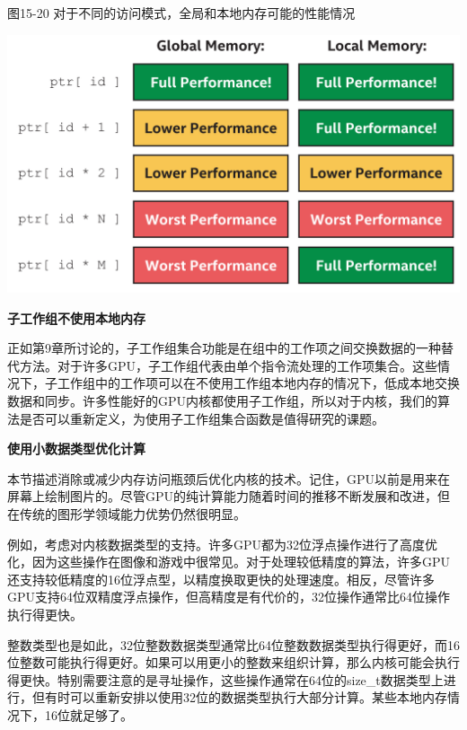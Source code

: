 \hspace*{\fill} \par %
图15-20 对于不同的访问模式，全局和本地内存可能的性能情况
\begin{center}
	\includegraphics[width=1.0\textwidth]{content/chapter-15/images/15}
\end{center}

\hspace*{\fill} \par %
\textbf{子工作组不使用本地内存}

正如第9章所讨论的，子工作组集合功能是在组中的工作项之间交换数据的一种替代方法。对于许多GPU，子工作组代表由单个指令流处理的工作项集合。这些情况下，子工作组中的工作项可以在不使用工作组本地内存的情况下，低成本地交换数据和同步。许多性能好的GPU内核都使用子工作组，所以对于内核，我们的算法是否可以重新定义，为使用子工作组集合函数是值得研究的课题。\par

\hspace*{\fill} \par %
\textbf{使用小数据类型优化计算}

本节描述消除或减少内存访问瓶颈后优化内核的技术。记住，GPU以前是用来在屏幕上绘制图片的。尽管GPU的纯计算能力随着时间的推移不断发展和改进，但在传统的图形学领域能力优势仍然很明显。\par

例如，考虑对内核数据类型的支持。许多GPU都为32位浮点操作进行了高度优化，因为这些操作在图像和游戏中很常见。对于处理较低精度的算法，许多GPU还支持较低精度的16位浮点型，以精度换取更快的处理速度。相反，尽管许多GPU支持64位双精度浮点操作，但高精度是有代价的，32位操作通常比64位操作执行得更快。\par

整数类型也是如此，32位整数数据类型通常比64位整数数据类型执行得更好，而16位整数可能执行得更好。如果可以用更小的整数来组织计算，那么内核可能会执行得更快。特别需要注意的是寻址操作，这些操作通常在64位的size\_t数据类型上进行，但有时可以重新安排以使用32位的数据类型执行大部分计算。某些本地内存情况下，16位就足够了。\par

